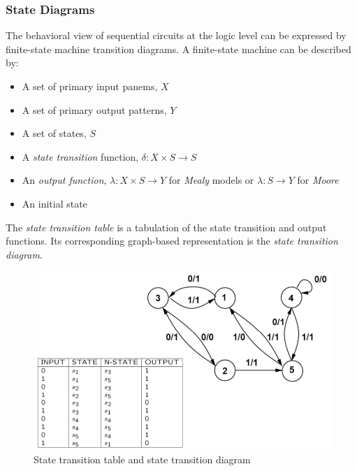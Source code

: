 \subsubsection{State  Diagrams}
The behavioral view of sequential circuits at the logic level can be expressed by finite-state machine transition diagrams. A finite-state machine can be described by:
\begin{itemize}
\item A set of primary input panems, $X$
\item A set of primary output patterns, $Y$
\item A set of states, $S$
\item A \textit{state transition} function, $\delta : X \times S \rightarrow S$
\item An \textit{output function},  $\lambda :  X \times S \rightarrow Y $ for \textit{Mealy} models or  $\lambda : S \rightarrow Y $ for \textit{Moore}
\item An initial state
\end{itemize}
The \textit{state transition table} is a tabulation of the state transition and output functions. Its corresponding graph-based representation is the \textit{state transition diagram}.
\begin{figure}[H]
	\centering
	\includegraphics[height=45 mm]{./Cap2/Images/Image06.png}
	\caption[Optional caption]{State transition table and state transition diagram}
	\label{fig:stateDia}
\end{figure}

